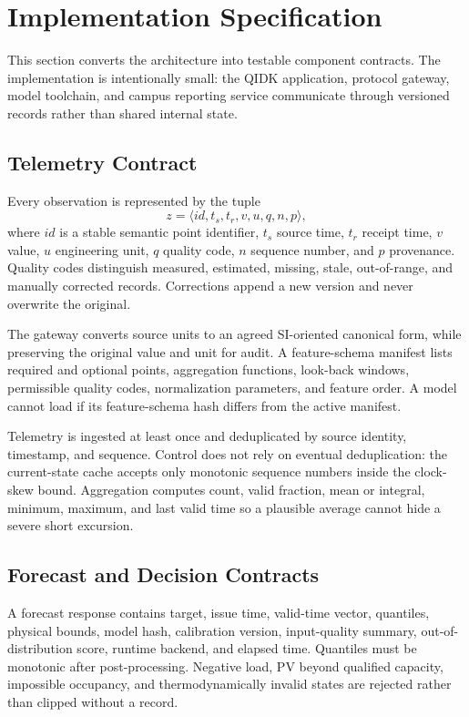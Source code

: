 \section{Implementation Specification}

This section converts the architecture into testable component contracts. The implementation is intentionally small: the QIDK application, protocol gateway, model toolchain, and campus reporting service communicate through versioned records rather than shared internal state.

\subsection{Telemetry Contract}

Every observation is represented by the tuple
\begin{equation}
	z=\langle id,t_s,t_r,v,u,q,n,p\rangle,
\end{equation}
where $id$ is a stable semantic point identifier, $t_s$ source time, $t_r$ receipt time, $v$ value, $u$ engineering unit, $q$ quality code, $n$ sequence number, and $p$ provenance. Quality codes distinguish measured, estimated, missing, stale, out-of-range, and manually corrected records. Corrections append a new version and never overwrite the original.

The gateway converts source units to an agreed SI-oriented canonical form, while preserving the original value and unit for audit. A feature-schema manifest lists required and optional points, aggregation functions, look-back windows, permissible quality codes, normalization parameters, and feature order. A model cannot load if its feature-schema hash differs from the active manifest.

Telemetry is ingested at least once and deduplicated by source identity, timestamp, and sequence. Control does not rely on eventual deduplication: the current-state cache accepts only monotonic sequence numbers inside the clock-skew bound. Aggregation computes count, valid fraction, mean or integral, minimum, maximum, and last valid time so a plausible average cannot hide a severe short excursion.

\subsection{Forecast and Decision Contracts}

A forecast response contains target, issue time, valid-time vector, quantiles, physical bounds, model hash, calibration version, input-quality summary, out-of-distribution score, runtime backend, and elapsed time. Quantiles must be monotonic after post-processing. Negative load, PV beyond qualified capacity, impossible occupancy, and thermodynamically invalid states are rejected rather than clipped without a record.


